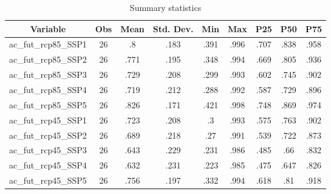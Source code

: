 \begin{table}[htbp]\centering \caption{Summary statistics\label{sumstat}}
\begin{tabular}{l c c c c c c c c}\hline\hline
\multicolumn{1}{c}{Variable} & Obs & Mean & Std. Dev.
 & Min & Max & P25 & P50 & P75  \\ \hline
ac\_fut\_rcp85\_SSP1 & 26 & .8 & .183 & .391 & .996 & .707 & .838 & .958 \\
ac\_fut\_rcp85\_SSP2 & 26 & .771 & .195 & .348 & .994 & .669 & .805 & .936 \\
ac\_fut\_rcp85\_SSP3 & 26 & .729 & .208 & .299 & .993 & .602 & .745 & .902 \\
ac\_fut\_rcp85\_SSP4 & 26 & .719 & .212 & .288 & .992 & .587 & .729 & .896 \\
ac\_fut\_rcp85\_SSP5 & 26 & .826 & .171 & .421 & .998 & .748 & .869 & .974 \\
ac\_fut\_rcp45\_SSP1 & 26 & .723 & .208 & .3 & .993 & .575 & .763 & .902 \\
ac\_fut\_rcp45\_SSP2 & 26 & .689 & .218 & .27 & .991 & .539 & .722 & .873 \\
ac\_fut\_rcp45\_SSP3 & 26 & .643 & .229 & .231 & .986 & .485 & .66 & .832 \\
ac\_fut\_rcp45\_SSP4 & 26 & .632 & .231 & .223 & .985 & .475 & .647 & .826 \\
ac\_fut\_rcp45\_SSP5 & 26 & .756 & .197 & .332 & .994 & .618 & .81 & .918 \\
\hline\end{tabular}
\end{table}
